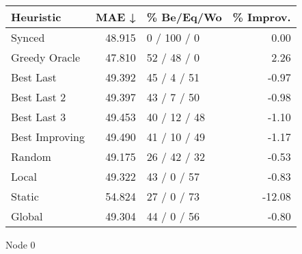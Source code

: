 \begin{tabular}{lrlr}
\toprule
\textbf{Heuristic} & \textbf{MAE ↓} & \textbf{\% Be/Eq/Wo} & \textbf{\% Improv.} \\
\midrule
            Synced &         48.915 &          0 / 100 / 0 &                0.00 \\
     Greedy Oracle &         47.810 &          52 / 48 / 0 &                2.26 \\
         Best Last &         49.392 &          45 / 4 / 51 &               -0.97 \\
       Best Last 2 &         49.397 &          43 / 7 / 50 &               -0.98 \\
       Best Last 3 &         49.453 &         40 / 12 / 48 &               -1.10 \\
    Best Improving &         49.490 &         41 / 10 / 49 &               -1.17 \\
            Random &         49.175 &         26 / 42 / 32 &               -0.53 \\
             Local &         49.322 &          43 / 0 / 57 &               -0.83 \\
            Static &         54.824 &          27 / 0 / 73 &              -12.08 \\
            Global &         49.304 &          44 / 0 / 56 &               -0.80 \\
\bottomrule
\end{tabular}
\caption{Node 0}
\label{tab:iid_lr05_le2_bs2_0}
